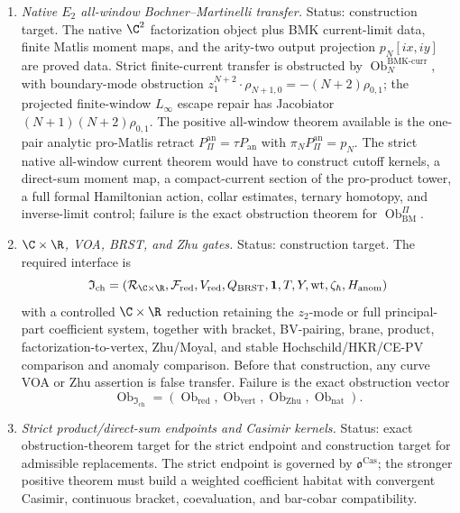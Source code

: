 \begin{enumerate}
  \item \emph{Native \(E_2\) all-window Bochner--Martinelli transfer.}
  Status: construction target.  The native \(\C^2\) factorization object
  plus BMK current-limit data, finite Matlis moment maps, and the
  arity-two output projection \(p_N[ix,iy]\) are proved data.  Strict
  finite-current transfer is obstructed by
  \(\operatorname{Ob}^{\mathrm{BMK\mbox{-}curr}}_N\), with boundary-mode
  obstruction
  \(z_1^{N+2}\cdot\rho_{N+1,0}=-(N+2)\rho_{0,1}\); the projected finite-window
  \(L_\infty\) escape repair has Jacobiator
  \((N+1)(N+2)\rho_{0,1}\).  The positive all-window theorem available
  is the one-pair analytic pro-Matlis retract
  \(P_{\Pi}^{\mathrm{an}}=\tau P_{\mathrm{an}}\) with
  \(\pi_NP_{\Pi}^{\mathrm{an}}=p_N\).  The strict native all-window
  current theorem would have to construct cutoff kernels, a direct-sum
  moment map, a compact-current section of the pro-product tower, a full
  formal Hamiltonian action, collar estimates, ternary homotopy, and
  inverse-limit control; failure is the exact obstruction theorem for
  \(\operatorname{Ob}^{\Pi}_{\mathrm{BM}}\).

  \item \emph{\(\C\times\R\), VOA, BRST, and Zhu gates.}
  Status: construction target.  The required interface is
  \[
    \mathfrak I_{\mathrm{ch}}
    =
    (\mathcal R_{\C\times\R},\mathcal F_{\mathrm{red}},
     V_{\mathrm{red}},Q_{\mathrm{BRST}},\mathbf 1,T,Y,
     \operatorname{wt},\zeta_{\hbar},H_{\mathrm{anom}})
  \]
  with a controlled \(\C\times\R\) reduction retaining the \(z_2\)-mode or
  full principal-part coefficient system, together with bracket,
  BV-pairing, brane, product, factorization-to-vertex, Zhu/Moyal, and
  stable Hochschild/HKR/CE-PV comparison and anomaly comparison.  Before
  that construction, any curve VOA or Zhu assertion is false transfer.
  Failure is the exact obstruction vector
  \[
    \operatorname{Ob}_{\mathfrak I_{\mathrm{ch}}}
    =
    (\operatorname{Ob}_{\mathrm{red}},
     \operatorname{Ob}_{\mathrm{vert}},
     \operatorname{Ob}_{\mathrm{Zhu}},
     \operatorname{Ob}_{\mathrm{nat}}).
  \]

  \item \emph{Strict product/direct-sum endpoints and Casimir kernels.}
  Status: exact obstruction-theorem target for the strict endpoint and
  construction target for admissible replacements.  The strict endpoint
  is governed by \(\mathfrak o^{\mathrm{Cas}}\); the stronger positive
  theorem must build a weighted coefficient habitat with convergent
  Casimir, continuous bracket, coevaluation, and bar-cobar compatibility.


\end{enumerate}
